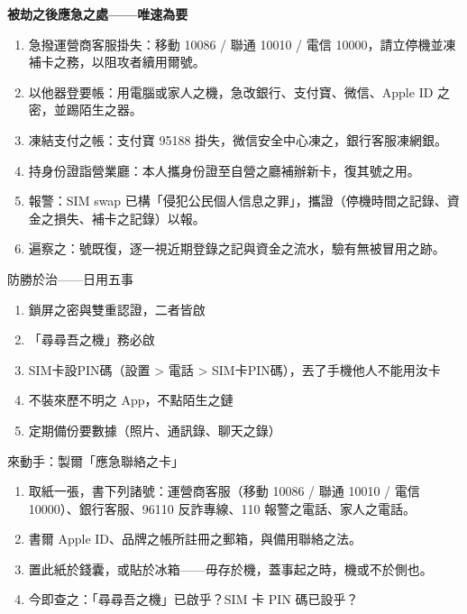 \textbf{被劫之後應急之處——唯速為要}\par

\begin{enumerate}
  \item 急撥運營商客服掛失：移動 10086 / 聯通 10010 / 電信 10000，請立停機並凍補卡之務，以阻攻者續用爾號。
  \item 以他器登要帳：用電腦或家人之機，急改銀行、支付寶、微信、Apple ID 之密，並踢陌生之器。
  \item 凍結支付之帳：支付寶 95188 掛失，微信安全中心凍之，銀行客服凍網銀。
  \item 持身份證詣營業廳：本人攜身份證至自營之廳補辦新卡，復其號之用。
  \item 報警：SIM swap 已構「侵犯公民個人信息之罪」，攜證（停機時間之記錄、資金之損失、補卡之記錄）以報。
  \item 遍察之：號既復，逐一視近期登錄之記與資金之流水，驗有無被冒用之跡。
\end{enumerate}

\begin{tcbwarn}{防勝於治——日用五事}
\begin{enumerate}
  \item 鎖屏之密與雙重認證，二者皆啟
  \item 「尋尋吾之機」務必啟
  \item SIM卡設PIN碼（設置 > 電話 > SIM卡PIN碼），丟了手機他人不能用汝卡
  \item 不裝來歷不明之 App，不點陌生之鏈
  \item 定期備份要數據（照片、通訊錄、聊天之錄）
\end{enumerate}

\end{tcbwarn}

\begin{tcbpractice}{來動手：製爾「應急聯絡之卡」}
\begin{enumerate}
  \item 取紙一張，書下列諸號：運營商客服（移動 10086 / 聯通 10010 / 電信 10000）、銀行客服、96110 反詐專線、110 報警之電話、家人之電話。
  \item 書爾 Apple ID、品牌之帳所註冊之郵箱，與備用聯絡之法。
  \item 置此紙於錢囊，或貼於冰箱——毋存於機，蓋事起之時，機或不於側也。
  \item 今即查之：「尋尋吾之機」已啟乎？SIM 卡 PIN 碼已設乎？
\end{enumerate}

\end{tcbpractice}

